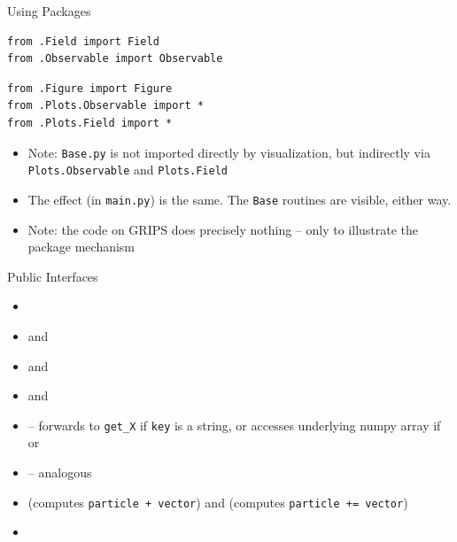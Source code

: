 
\begin{frame}[fragile]{Using Packages}
%
\begin{tcbraster}[raster columns=2,
                  raster equal height,
                  nobeforeafter,
                  raster column skip=0.5cm]
%
\begin{codebox}
\begin{verbatim}
from .Field import Field
from .Observable import Observable
\end{verbatim}
\end{codebox}
%
\begin{codebox}
\begin{verbatim}
from .Figure import Figure
from .Plots.Observable import *
from .Plots.Field import *
\end{verbatim}
\end{codebox}
%
\end{tcbraster}
%
\begin{itemize}
\item Note: \texttt{Base.py} is not imported directly by visualization, but indirectly via \texttt{Plots.Observable} and \texttt{Plots.Field}
\item The effect (in \texttt{main.py}) is the same. The \texttt{Base} routines are visible, either way.
\item Note: the code on GRIPS does precisely nothing -- only to illustrate the package mechanism
\end{itemize}
%
\end{frame}


\begin{frame}[fragile]{Public Interfaces}
%
\begin{defbox}
\begin{itemize}
\item {}
\item {} and 
\item {} and 
\item {} and 
\item {} -- forwards to \texttt{get\_X} if \texttt{key} is a string, or accesses underlying numpy array if  or 
\item {} -- analogous
\item {} (computes \texttt{particle + vector}) and  (computes \texttt{particle += vector})
\item {}
\end{itemize}
\end{defbox}
%
\end{frame}

